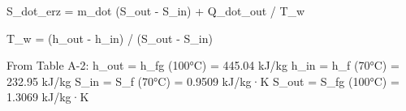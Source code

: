 S_dot_erz = m_dot (S_out - S_in) + Q_dot_out / T_w  

T_w = (h_out - h_in) / (S_out - S_in)  

From Table A-2:  
h_out = h_fg (100°C) = 445.04 kJ/kg  
h_in = h_f (70°C) = 232.95 kJ/kg  
S_in = S_f (70°C) = 0.9509 kJ/kg·K  
S_out = S_fg (100°C) = 1.3069 kJ/kg·K